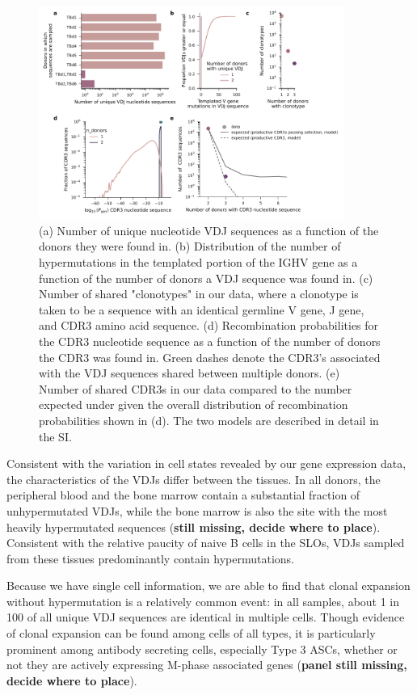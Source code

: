 \begin{figure}
    \centering
    \includegraphics[width=10cm]{figs/Tabula_Bursa/ED_donor_sharing.pdf}
    \caption[Characteristics of  VDJ sequences found in multiple donors.]{(a) Number of unique nucleotide VDJ sequences as a function of the donors they were found in. (b) Distribution of the number of hypermutations in the templated portion of the IGHV gene as a function of the number of donors a VDJ sequence was found in. (c) Number of shared "clonotypes" in our data, where a clonotype is taken to be a sequence with an identical germline V gene, J gene, and CDR3 amino acid sequence. (d) Recombination probabilities for the CDR3 nucleotide sequence as a function of the number of donors the CDR3 was found in. Green dashes denote the CDR3's associated with the VDJ sequences shared between multiple donors. (e) Number of shared CDR3s in our data compared to the number expected under given the overall distribution of recombination probabilities shown in (d). The two models are described in detail in the SI.}
    \label{ED:multidonor-vdjs}
\end{figure}

Consistent with the variation in cell states revealed by our gene expression data, the characteristics of the VDJs differ between the tissues. In all donors, the peripheral blood and the bone marrow contain a substantial fraction of unhypermutated VDJs, while the bone marrow is also the site with the most heavily hypermutated sequences (\textbf{still missing, decide where to place}). Consistent with the relative paucity of naive B cells in the SLOs, VDJs sampled from these tissues predominantly contain hypermutations. 

Because we have single cell information, we are able to find that clonal expansion without hypermutation is a relatively common event: in all samples, about 1 in 100 of all unique VDJ sequences are identical in multiple cells. Though evidence of clonal expansion can be found among cells of all types, it is particularly prominent among antibody secreting cells, especially Type 3 ASCs, whether or not they are actively expressing M-phase associated genes (\textbf{panel still missing, decide where to place}). 

